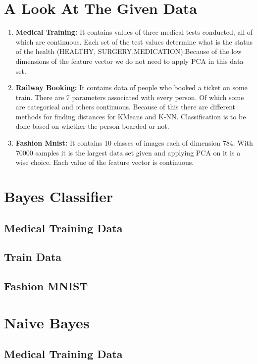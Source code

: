 \documentclass[conference]{IEEEtran}
\begin{document}
    \section{A Look At The Given Data}
    \begin{enumerate}
        \item \textbf{Medical Training:} It contains values of three medical tests conducted, all of which are continuous. Each set of the test values determine what is the status of the health (HEALTHY, SURGERY,MEDICATION).Because of the low dimensions of the feature vector we do not need to apply PCA in this data set.
        \item \textbf{Railway Booking:} It contains data of people who booked a ticket on some train. There are 7 parameters associated with every person. Of which some are categorical and others continuous. Because of this there are different methods for finding distances for KMeans and K-NN. Classification is to be done based on whether the person boarded or not.
        \item \textbf{Fashion Mnist:} It contains 10 classes of images each of dimension 784. With 70000 samples it is the largest data set given and applying PCA on it is a wise choice. Each value of the feature vector is continuous. 
    \end{enumerate}
    
    \section{Bayes Classifier}
    \subsection{Medical Training Data}
    
    \subsection{Train Data}
    
    \subsection{Fashion MNIST}
    
    \section{Naive Bayes}
    \subsection{Medical Training Data}
    
\end{document}
